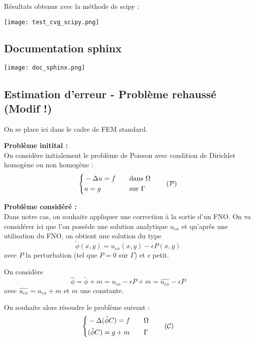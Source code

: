 Résultats obtenus avec la méthode de scipy :

\begin{minipage}{\linewidth}
	\centering
	\texttt{[image: test\_cvg\_scipy.png]}
\end{minipage}

\subsection{Documentation sphinx}

\begin{minipage}{\linewidth}
	\centering
	\texttt{[image: doc\_sphinx.png]}
\end{minipage}

\subsection{Estimation d'erreur - Problème rehaussé (Modif !) \faBookmarkO}

On se place ici dans le cadre de FEM standard. 

\textbf{Problème initital :} \\
On considère initialement le problème de Poisson avec condition de Dirichlet homogène ou non homogène :
\begin{equation}
	\left\{\begin{aligned}
		&-\Delta u=f \quad &&\text{dans } \Omega \\
		&u=g \quad &&\text{sur } \Gamma
	\end{aligned}\right. \label{pb_initial} \tag{$\mathcal{P}$}
\end{equation}

\textbf{Problème considéré :} \\
Dans notre cas, on souhaite appliquer une correction à la sortie d'un FNO.
On va considérer ici que l'on possède une solution analytique $u_{ex}$ et qu'après une utilisation du FNO, on obtient une solution du type
$$\tilde{\phi}(x,y) = u_{ex}(x,y)-\epsilon P(x,y)$$
avec $P$ la perturbation (tel que $P=0$ sur $\Gamma$) et $\epsilon$ petit.

On considère
$$\hat{\phi}=\tilde{\phi}+m=u_{ex}-\epsilon P+m=\widehat{u_{ex}}-\epsilon P$$
avec $\widehat{u_{ex}}=u_{ex}+m$ et $m$ une constante.

On souhaite alors résoudre le problème suivant :
\begin{equation}
	\left\{\begin{aligned}
		&-\Delta (\hat{\phi}C)=f \quad &&\Omega \\
		&(\hat{\phi}C)=g+m \quad &&\Gamma
	\end{aligned}\right. \label{pb_reh} \tag{$\mathcal{C}$}
\end{equation}

